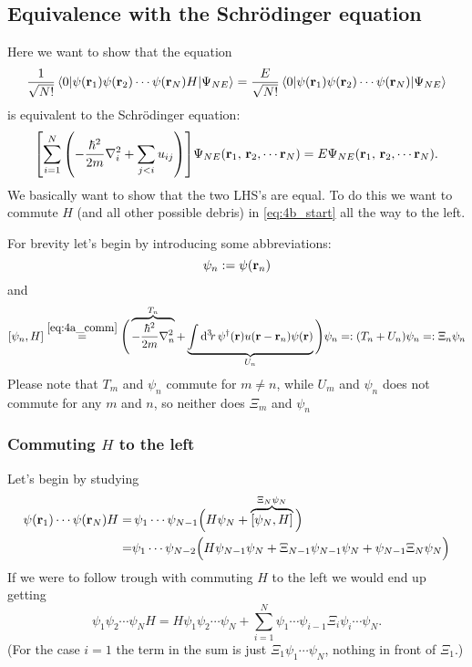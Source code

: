 \documentclass[11pt,letter, swedish, english
]{article}
\begin{document}
\subsection{Equivalence with the Schrödinger equation}
Here we want to show that the equation
\begin{equation}\label{eq:4b_start}
\frac{1}{\sqrt{N!}}
\mel{0}{\psi(\vb{r}_1)\psi(\vb{r}_2)\cdots\psi(\vb{r}_N)H}{\Psi_{NE}}
=\frac{E}{\sqrt{N!}}
\mel{0}{\psi(\vb{r}_1)\psi(\vb{r}_2)\cdots\psi(\vb{r}_N)}{\Psi_{NE}}
\end{equation}
is equivalent to the Schrödinger equation:
\begin{equation}\label{eq:4b_SE}
\qty[\sum_{i=1}^N\qty(-\frac{\hbar^2}{2m}\laplacian_i 
+ \sum_{j<i}u_{ij})]\Psi_{NE}(\vb{r}_1,\,\vb{r}_2,\cdots\vb{r}_N)
=E\Psi_{NE}(\vb{r}_1,\,\vb{r}_2,\cdots\vb{r}_N).
\end{equation}
We basically want to show that the two LHS's are equal. To do this we
want to commute $H$ (and all other possible debris) in \eqref{eq:4b_start}
all the way to the left.  

For brevity let's begin by introducing some abbreviations:
\begin{equation}
\psi_n:=\psi(\vb{r}_n)
\end{equation}
and
\begin{equation}
\comm{\psi_n}{H}\stackrel{\eqref{eq:4a_comm}}{=}
\Bigg(\overbrace{-\frac{\hbar^2}{2m}\laplacian_n}^{T_n}
+\underbrace{\int\rd^3\!r\,
\psi^\dagger(\vb{r})
u(\vb{r}-\vb{r}_n)\psi(\vb{r})}_{U_n}
\Bigg)\psi_n=:(T_n+U_n)\psi_n
=:\Xi_n\psi_n
\end{equation}
Please note that $T_m$ and $\psi_n$ commute for $m\neq n$, while $U_m$
and $\psi_n$ does not commute for any $m$ and $n$, so neither does
$\Xi_m$ and $\psi_n$


\subsubsection{Commuting $H$ to the left}
Let's begin by studying
\begin{equation}
\begin{aligned}
\psi(\vb{r}_1)\cdots\psi(\vb{r}_N)H=&
\,\psi_1\cdots\psi_{N-1}
\Big(
H\psi_N+\overbrace{\comm{\psi_N}{H}}^{\Xi_N\psi_N}
\Big)\\
=&\psi_1\cdots\psi_{N-2}
\Big(
H\psi_{N-1}\psi_N+\Xi_{N-1}\psi_{N-1}\psi_N + \psi_{N-1}\Xi_N\psi_N
\Big)
\end{aligned}
\end{equation}
If we were to follow trough with commuting $H$ to the left we would
end up getting
\begin{equation}\label{eq:4b_H_to_left}
\psi_1\psi_2\cdots\psi_{N}H=
H\psi_1\psi_2\cdots\psi_{N}
+\sum_{i=1}^N\psi_1\cdots\psi_{i-1}\Xi_i\psi_i\cdots\psi_N.
\end{equation}
(For the case $i=1$ the term in the sum is just
$\Xi_1\psi_1\cdots\psi_N$, nothing in front of $\Xi_1$.)
\end{document}
